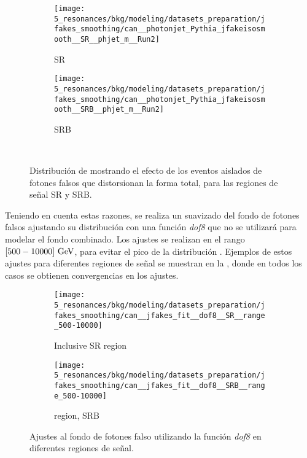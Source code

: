 \begin{figure}[ht!]
    \centering
    \begin{subfigure}[h]{0.49\linewidth}
        \centering
        \texttt{[image: 5\_resonances/bkg/modeling/datasets\_preparation/jfakes\_smoothing/can\_\_photonjet\_Pythia\_jfakeisosmooth\_\_SR\_\_phjet\_m\_\_Run2]}
        \caption{SR}
    \end{subfigure}
    \hfill
    \begin{subfigure}[h]{0.49\linewidth}
        \centering
        \texttt{[image: 5\_resonances/bkg/modeling/datasets\_preparation/jfakes\_smoothing/can\_\_photonjet\_Pythia\_jfakeisosmooth\_\_SRB\_\_phjet\_m\_\_Run2]}
        \caption{SRB}
    \end{subfigure}\\
    \caption{Distribución de \myj mostrando el efecto de los eventos aislados de fotones falsos que distorsionan la forma total, para las regiones de se\~nal SR y SRB.}
    \label{fig:bkg:modeling:preparation:jfakes_smooth:bkg_myj_distribution}
\end{figure}

Teniendo en cuenta estas razones, se realiza un suavizado del fondo de fotones falsos ajustando su distribución \myj con una función \textit{dof8} que no se utilizará para modelar el fondo combinado.
Los ajustes se realizan en el rango \([500-10000]~\text{GeV}\), para evitar el pico de la distribución \myj. Ejemplos de estos ajustes para diferentes regiones de señal se muestran en la \Fig{\ref{fig:bkg:modeling:preparation:jfakes_smooth:jfakes_fits}}, donde en todos los casos se obtienen convergencias en los ajustes.

\begin{figure}[ht!]
    \centering
    \begin{subfigure}[h]{0.49\linewidth}
        \centering
        \texttt{[image: 5\_resonances/bkg/modeling/datasets\_preparation/jfakes\_smoothing/can\_\_jfakes\_fit\_\_dof8\_\_SR\_\_range\_500-10000]}
        \caption{Inclusive SR region}
    \end{subfigure}
    \hfill
    \begin{subfigure}[h]{0.49\linewidth}
        \centering
        \texttt{[image: 5\_resonances/bkg/modeling/datasets\_preparation/jfakes\_smoothing/can\_\_jfakes\_fit\_\_dof8\_\_SRB\_\_range\_500-10000]}
        \caption{\btag region, SRB}
    \end{subfigure}
    \caption{Ajustes al fondo de fotones falso utilizando la función \textit{dof8} en diferentes regiones de se\~nal.}
    \label{fig:bkg:modeling:preparation:jfakes_smooth:jfakes_fits}
\end{figure}

